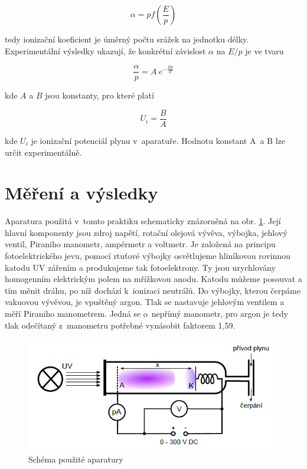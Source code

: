 \documentclass[a4paper,12pt]{article}
\begin{document}
\begin{equation}
	\alpha = p f \left( \frac {E}{p} \right) 
	\label{4}
\end{equation}

tedy ionizační koeficient je úměrný počtu srážek na jednotku délky. Experimentální výsledky ukazují, že konkrétní závislost $\alpha$ na $E/p$ je ve tvaru

\begin{equation}
	\frac{\alpha}{p} = A~e^{-\frac{Bp}{E}} 
	\label{5}
\end{equation}

kde $A$ a $B$ jsou konstanty, pro které platí

\begin{equation}
	U_i = \frac{B}{A}
	\label{6}
\end{equation}

kde $U_i$ je ionizační potenciál plynu v~aparatuře. Hodnotu konstant A~a B lze určit experimentálně.

\section{Měření a výsledky}

Aparatura použitá v~tomto praktiku schematicky znázorněná na obr. \ref{aparatura}. Její hlavní komponenty jsou zdroj napětí, rotační olejová vývěva, výbojka, jehlový ventil, Piraniho manometr, ampérmetr a voltmetr. Je založená na principu fotoelektrického jevu, pomocí rtuťové výbojky osvětlujeme hliníkovou rovinnou katodu UV zářením a produkujeme tak fotoelektrony. Ty jsou urychlovány homogenním elektrickým polem na mřížkovou anodu. Katodu můžeme posouvat a tím měnit dráhu, po níž dochází k~ionizaci neutrálů. Do výbojky, kterou čerpáme vakuovou vývěvou, je vpuštěný argon. Tlak se nastavuje jehlovým ventilem a měří Piraniho manometrem. Jedná se o~nepřímý manometr, pro argon je tedy tlak odečítaný z~manometru potřebné vynásobit faktorem 1,59.

\begin{figure}[h]
	\centering
	\includegraphics[width=130mm]{aparatura.png}
	\caption{Schéma použité aparatury}
	\label{aparatura}
\end{figure}
\end{document}
